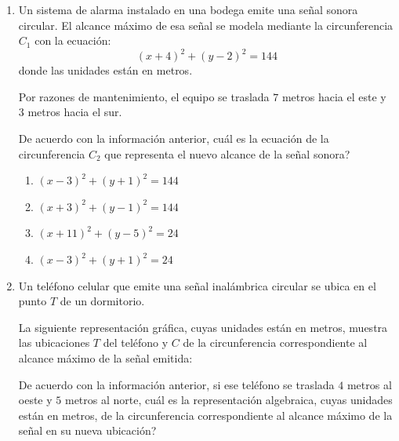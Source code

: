 \documentclass[11pt]{article}
\newcommand{\opcion}[2]{\item $#2$}
\newcommand{\rotuloxeste}{\mbox{\textit{x} (este)}}
\newcommand{\rotuloynorte}{\mbox{\textit{y} (norte)}}
\begin{document}
\begin{enumerate}[label=\textbf{\arabic*.}, itemsep=2.5cm]
\Needspace{0.72\textheight}
\item
Un sistema de alarma instalado en una bodega emite una se\~nal sonora circular. El alcance m\'aximo de esa se\~nal se modela mediante la circunferencia $C_1$ con la ecuaci\'on:
\[(x+4)^2+(y-2)^2=144\]
donde las unidades est\'an en metros.

Por razones de mantenimiento, el equipo se traslada $7$ metros hacia el este y $3$ metros hacia el sur.

De acuerdo con la informaci\'on anterior, \textquestiondown cu\'al es la ecuaci\'on de la circunferencia $C_2$ que representa el nuevo alcance de la se\~nal sonora?

\begin{enumerate}[label=\Alph*)]
  \opcion{A}{(x-3)^2+(y+1)^2=144}
  \opcion{B}{(x+3)^2+(y-1)^2=144}
  \opcion{C}{(x+11)^2+(y-5)^2=24}
  \opcion{D}{(x-3)^2+(y+1)^2=24}
\end{enumerate}

\Needspace{0.90\textheight}
\item
Un tel\'efono celular que emite una se\~nal inal\'ambrica circular se ubica en el punto $T$ de un dormitorio.

La siguiente representaci\'on gr\'afica, cuyas unidades est\'an en metros, muestra las ubicaciones $T$ del tel\'efono y $C$ de la circunferencia correspondiente al alcance m\'aximo de la se\~nal emitida:

\begin{center}
\end{center}

De acuerdo con la informaci\'on anterior, si ese tel\'efono se traslada $4$ metros al oeste y $5$ metros al norte, \textquestiondown cu\'al es la representaci\'on algebraica, cuyas unidades est\'an en metros, de la circunferencia correspondiente al alcance m\'aximo de la se\~nal en su nueva ubicaci\'on?


\end{enumerate}
\end{document}
